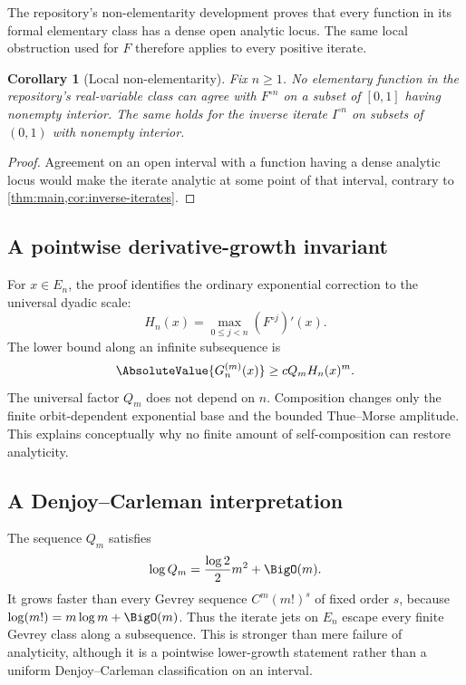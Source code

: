 \documentclass[11pt,oneside]{article}
\newtheorem{corollary}[theorem]{Corollary}
\theoremstyle{definition}
\theoremstyle{remark}
\newcommand{\comp}{\mathbin{\circ}}
\begin{document}
The repository's non-elementarity development proves that every function in its
formal elementary class has a dense open analytic locus.  The same local obstruction
used for $F$ therefore applies to every positive iterate.

\begin{corollary}[Local non-elementarity]
\label{cor:non-elementary}
Fix $n\geq1$.  No elementary function in the repository's real-variable class can
agree with $F^{\comp n}$ on a subset of $[0,1]$ having nonempty interior.
The same holds for the inverse iterate $I^{\comp n}$ on subsets of $(0,1)$ with
nonempty interior.
\end{corollary}

\begin{proof}
Agreement on an open interval with a function having a dense analytic locus would
make the iterate analytic at some point of that interval, contrary to
\cref{thm:main,cor:inverse-iterates}.
\end{proof}

\subsection{A pointwise derivative-growth invariant}

For $x\in E_n$, the proof identifies the ordinary exponential correction to the
universal dyadic scale:
\begin{equation}
 H_n(x)=\max_{0\leq j<n}(F^{\comp j})'(x).
 \label{eq:H-interpretation}
\end{equation}
The lower bound along an infinite subsequence is
\begin{equation}
 \AbsoluteValue{G_n^{(m)}(x)}\geq cQ_mH_n(x)^m.
 \label{eq:sharp-form-growth}
\end{equation}
The universal factor $Q_m$ does not depend on $n$.  Composition changes only the
finite orbit-dependent exponential base and the bounded Thue--Morse amplitude.
This explains conceptually why no finite amount of self-composition can restore
analyticity.

\subsection{A Denjoy--Carleman interpretation}

The sequence $Q_m$ satisfies
\[
 \log Q_m=\frac{\log2}{2}m^2+\BigO(m).
\]
It grows faster than every Gevrey sequence $C^m(m!)^s$ of fixed order $s$, because
$\log(m!)=m\log m+\BigO(m)$.  Thus the iterate jets on $E_n$ escape every finite
Gevrey class along a subsequence.  This is stronger than mere failure of analyticity,
although it is a pointwise lower-growth statement rather than a uniform
Denjoy--Carleman classification on an interval.
\end{document}
